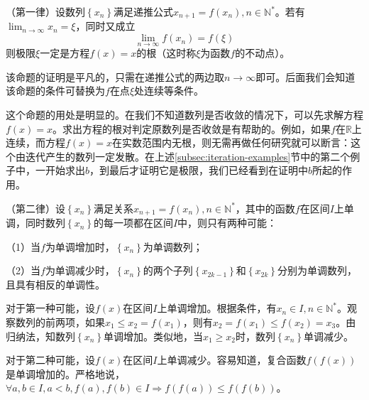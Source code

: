 \begin{theorem}
（第一律）设数列\(\left\{ x_{n} \right\}\)满足递推公式\(x_{n + 1} = f \left( x_{n} \right) , n \in \mathbb{N}^{*}\)。若有\(\lim_{n \to \infty} x_{n} = \xi\)，同时又成立
\begin{equation}
    \lim_{n \to \infty} f \left( x_{n} \right) = f \left( \xi \right)
\end{equation}
则极限\(\xi\)一定是方程\(f \left( x \right) = x\)的根（这时称\(\xi\)为函数\(f\)的{\heiti{}不动点}）。
\end{theorem}

该命题的证明是平凡的，只需在递推公式的两边取\(n \to \infty\)即可。后面我们会知道该命题的条件可替换为\(f\)在点\(\xi\)处连续等条件。

这个命题的用处是明显的。在我们不知道数列是否收敛的情况下，可以先求解方程\(f \left( x \right) = x\)。求出方程的根对判定原数列是否收敛是有帮助的。例如，如果\(f\)在\(\mathbb R\)上连续，而方程\(f \left( x \right) = x\)在实数范围内无根，则无需再做任何研究就可以断言：这个由迭代产生的数列一定发散。在上述\ref{subsec:iteration-examples}节中的第二个例子中，一开始求出\(b\)，到最后才证明它是极限，我们已经看到在证明中\(b\)所起的作用。
\newpage
\begin{theorem}
（第二律）设\(\left\{ x_{n} \right\}\)满足关系\(x_{n + 1} = f \left( x_{n} \right) , n \in \mathbb{N}^{*}\)，其中的函数\(f\)在区间\(I\)上单调，同时数列\(\left\{ x_{n} \right\}\)的每一项都在区间\(I\)中，则只有两种可能：

（1）当\(f\)为单调增加时，\(\left\{ x_{n} \right\}\)为单调数列；

（2）当\(f\)为单调减少时，\(\left\{ x_{n} \right\}\)的两个子列\(\left\{ x_{2 k - 1} \right\}\)和\(\left\{ x_{2 k} \right\}\)分别为单调数列，且具有相反的单调性。
\end{theorem}

对于第一种可能，设\(f \left( x \right)\)在区间\(I\)上单调增加。根据条件，有\(x_{n} \in I , n \in \mathbb{N}^{*}\)。观察数列的前两项，如果\(x_{1} \le x_{2} = f \left( x_{1} \right)\)，则有\(x_{2} = f \left( x_{1} \right) \le f \left( x_{2} \right) = x_{3}\)。由归纳法，知数列\(\left\{ x_{n} \right\}\)单调增加。类似地，当\(x_{1} \ge x_{2}\)时，数列\(\left\{ x_{n} \right\}\)单调减少。

对于第二种可能，设\(f \left( x \right)\)在区间\(I\)上单调减少。容易知道，复合函数\(f \left( f \left( x \right) \right)\)是单调增加的。严格地说，\(\forall a , b \in I , a < b , f \left( a \right) , f \left( b \right) \in I \Rightarrow f \left( f \left( a \right) \right) \le f \left( f \left( b \right) \right)\)。

